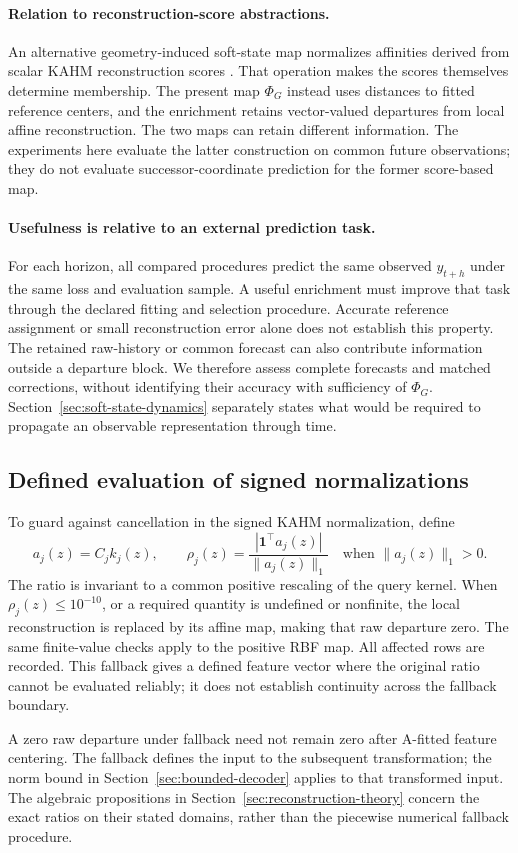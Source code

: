 \paragraph{Relation to reconstruction-score abstractions.}
An alternative geometry-induced soft-state map normalizes affinities
derived from scalar KAHM reconstruction scores
\citep{KumarKargaran2026Limits}. That operation makes the scores themselves
determine membership. The present map $\Phi_G$ instead uses distances
to fitted reference centers, and the enrichment retains vector-valued
departures from local affine reconstruction. The two maps can retain
different information. The experiments here evaluate the latter
construction on common future observations; they do not evaluate
successor-coordinate prediction for the former score-based map.

\paragraph{Usefulness is relative to an external prediction task.}
For each horizon, all compared procedures predict the same observed
$y_{t+h}$ under the same loss and evaluation sample. A useful enrichment
must improve that task through the declared fitting and selection
procedure. Accurate reference assignment or small reconstruction error
alone does not establish this property. The retained raw-history or
common forecast can also contribute information outside a departure
block. We therefore assess complete forecasts and matched corrections,
without identifying their accuracy with sufficiency of $\Phi_G$.
Section~\ref{sec:soft-state-dynamics} separately states what would be
required to propagate an observable representation through time.

\subsection{Defined evaluation of signed normalizations}

To guard against cancellation in the signed KAHM normalization, define
\begin{equation}
 a_j(z)=C_j k_j(z),\qquad
 \rho_j(z)=\frac{|\mathbf1^\top a_j(z)|}{\|a_j(z)\|_1}
 \quad\text{when }\|a_j(z)\|_1>0.
 \label{eq:mechanism-relative-denominator}
\end{equation}
The ratio is invariant to a common positive rescaling of the query kernel.
When $\rho_j(z)\le10^{-10}$, or a required quantity is undefined or
nonfinite, the local reconstruction is replaced by its affine map, making
that raw departure zero. The same finite-value checks apply to the positive
RBF map. All affected rows are recorded. This fallback gives a defined
feature vector where the original ratio cannot be evaluated reliably;
it does not establish continuity across the fallback boundary.


A zero raw departure under fallback need not remain zero after A-fitted
feature centering. The fallback defines the input to the subsequent
transformation; the norm bound in Section~\ref{sec:bounded-decoder}
applies to that transformed input. The algebraic propositions in
Section~\ref{sec:reconstruction-theory} concern the exact ratios on their stated
domains, rather than the piecewise numerical fallback procedure.
